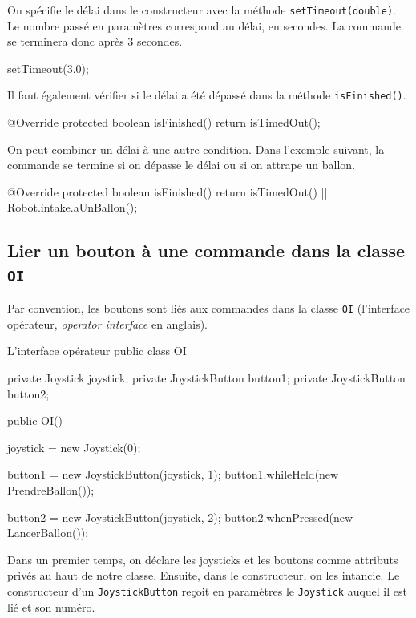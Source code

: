 \documentclass[12pt]{report}
\begin{document}
On spécifie le délai dans le constructeur avec la méthode \texttt{setTimeout(double)}. Le nombre passé en paramètres correspond au délai, en secondes. La commande se terminera donc après 3 secondes.

\begin{code}
	setTimeout(3.0);
\end{code}

Il faut également vérifier si le délai a été dépassé dans la méthode \texttt{isFinished()}.

\begin{code}
@Override
protected boolean isFinished() {
  return isTimedOut();
}
\end{code}

On peut combiner un délai à une autre condition. Dans l'exemple suivant, la commande se termine si on dépasse le délai ou si on attrape un ballon.

\begin{code}
@Override
protected boolean isFinished() {
  return isTimedOut() || Robot.intake.aUnBallon();
}
\end{code}


\subsection{Lier un bouton à une commande dans la classe \texttt{OI}}
Par convention, les boutons sont liés aux commandes dans la classe \texttt{OI} (l'interface opérateur, \textit{operator interface} en anglais). 

\begin{MyTCB}{L'interface opérateur}
public class OI {

  private Joystick joystick;
  private JoystickButton button1;
  private JoystickButton button2;

  public OI() {

    joystick = new Joystick(0);

    button1 = new JoystickButton(joystick, 1);
    button1.whileHeld(new PrendreBallon());

    button2 = new JoystickButton(joystick, 2);
    button2.whenPressed(new LancerBallon());

  }

}
\end{MyTCB}

Dans un premier temps, on déclare les joysticks et les boutons comme attributs privés au haut de notre classe. Ensuite, dans le constructeur, on les intancie. Le constructeur d'un \texttt{JoystickButton} reçoit en paramètres le \texttt{Joystick} auquel il est lié et son numéro.
\end{document}
